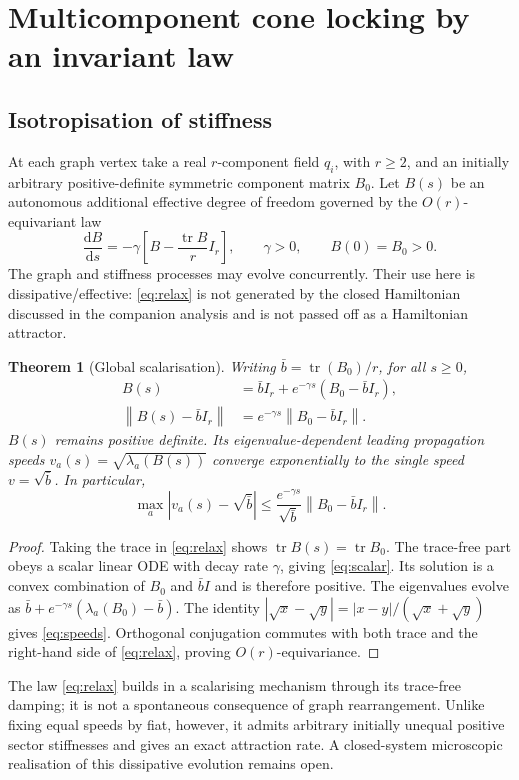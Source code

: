 \documentclass[11pt,a4paper]{article}
\numberwithin{equation}{section}
\newtheorem{theorem}{Theorem}[section]
\newcommand{\barb}{\bar b}
\newcommand{\norm}[1]{\left\lVert#1\right\rVert}
\newcommand{\dd}{\mathrm d}
\newcommand{\1}{\mathbf{1}}
\newcommand{\tr}{\operatorname{tr}}
\begin{document}
\section{Multicomponent cone locking by an invariant law}
\subsection{Isotropisation of stiffness}
At each graph vertex take a real $r$-component field $q_i$, with $r\geq2$, and an initially arbitrary positive-definite symmetric component matrix $B_0$. Let $B(s)$ be an autonomous additional effective degree of freedom governed by the $O(r)$-equivariant law
\begin{equation}\label{eq:relax}
 \frac{\dd B}{\dd s}=-\gamma\left[B-\frac{\tr B}{r}I_r\right],
 \qquad\gamma>0,\qquad B(0)=B_0>0.
\end{equation}
The graph and stiffness processes may evolve concurrently. Their use here is dissipative/effective: \eqref{eq:relax} is not generated by the closed Hamiltonian discussed in the companion analysis and is not passed off as a Hamiltonian attractor.
\begin{theorem}[Global scalarisation]\label{thm:scalar}
Writing $\barb=\tr(B_0)/r$, for all $s\geq0$,
\begin{equation}\label{eq:scalar}
\begin{aligned}
 B(s)&=\barb I_r+e^{-\gamma s}(B_0-\barb I_r),\\
 \norm{B(s)-\barb I_r}&=e^{-\gamma s}\norm{B_0-\barb I_r}.
\end{aligned}
\end{equation}
$B(s)$ remains positive definite. Its eigenvalue-dependent leading propagation speeds $v_a(s)=\sqrt{\lambda_a(B(s))}$ converge exponentially to the single speed $v=\sqrt{\barb}$. In particular,
\begin{equation}\label{eq:speeds}
 \max_a|v_a(s)-\sqrt{\barb}|\leq
 \frac{e^{-\gamma s}}{\sqrt{\barb}}\norm{B_0-\barb I_r}.
\end{equation}
\end{theorem}
\begin{proof}
Taking the trace in \eqref{eq:relax} shows $\tr B(s)=\tr B_0$. The trace-free part obeys a scalar linear ODE with decay rate $\gamma$, giving \eqref{eq:scalar}. Its solution is a convex combination of $B_0$ and $\barb I$ and is therefore positive. The eigenvalues evolve as $\barb+e^{-\gamma s}(\lambda_a(B_0)-\barb)$. The identity $|\sqrt{x}-\sqrt{y}|=|x-y|/(\sqrt{x}+\sqrt{y})$ gives \eqref{eq:speeds}. Orthogonal conjugation commutes with both trace and the right-hand side of \eqref{eq:relax}, proving $O(r)$-equivariance.
\end{proof}
The law \eqref{eq:relax} builds in a scalarising mechanism through its trace-free damping; it is not a spontaneous consequence of graph rearrangement. Unlike fixing equal speeds by fiat, however, it admits arbitrary initially unequal positive sector stiffnesses and gives an exact attraction rate. A closed-system microscopic realisation of this dissipative evolution remains open.
\end{document}
